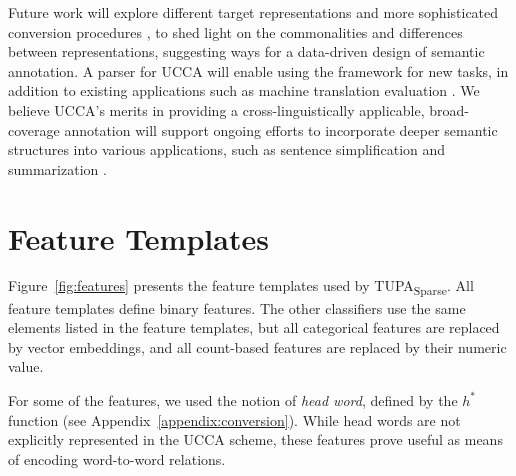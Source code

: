\documentclass[11pt,a4paper]{article}
\newcommand{\parser}[1]{TUPA\textsubscript{#1}}
\newcommand{\figref}[1]{Figure~\ref{#1}}
\begin{document}
Future work will explore different target
representations and more sophisticated conversion procedures \cite{kong-15},
to shed light on the commonalities and differences between
representations, suggesting ways for a data-driven design of semantic annotation.
A parser for UCCA will enable using the framework for new tasks,
in addition to existing applications such as machine translation
evaluation \cite{birch2016hume}.
We believe UCCA's merits in providing a cross-linguistically applicable,
broad-coverage annotation will support ongoing efforts to incorporate deeper
semantic structures into various applications,
such as sentence simplification \cite{narayan2014hybrid} and summarization \cite{liu2015toward}.


\newpage








\newpage
\appendix
\section{Feature Templates}
\label{appendix:features}

\figref{fig:features} presents the feature templates used by \parser{Sparse}.
All feature templates define binary features.
The other classifiers use the same elements listed in the feature templates,
but all categorical features are replaced by vector embeddings,
and all count-based features are replaced by their numeric value.

For some of the features, we used the notion of \textit{head word},
defined by the $h^*$ function (see Appendix~\ref{appendix:conversion}).
While head words are not explicitly represented in the UCCA scheme, these
features prove useful as means of encoding word-to-word relations.
\end{document}
